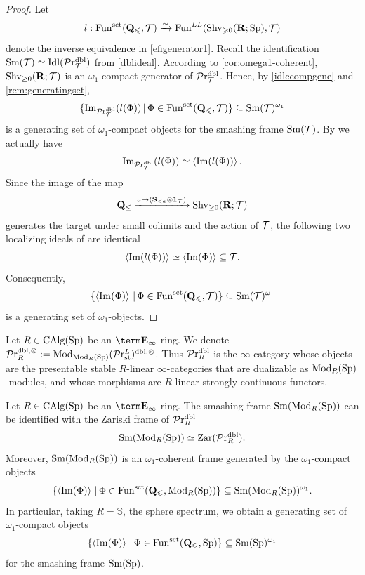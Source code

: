 \documentclass[10pt,a4paper,oneside]{article}
\begin{document}
\begin{proof}
Let $$l:\operatorname{Fun}^{\operatorname{sct}}(\mathbf{Q}_{\leqslant},\mathcal{T})\xrightarrow{\sim}\operatorname{Fun}^{L L}(\operatorname{Shv}_{\geqslant 0}(\mathbf{R} ; \mathrm{Sp}), \mathcal{T})$$ denote the inverse equivalence in \cref{efigenerator1}.
Recall the identification $\operatorname{Sm}(\mathcal{T})\simeq\operatorname{Idl}(\mathcal{P}\mathrm{r}_{\mathcal{T}}^{\operatorname{dbl}})$ from \cref{dblideal}. According to \cref{cor:omega1-coherent}, $\operatorname{Shv}_{\geq0}(\mathbf{R};\mathcal{T})$ is an $\omega_1$-compact generator of $\mathcal{P}\mathrm{r}_{\mathcal{T}}^{\operatorname{dbl}}$. Hence, by \cref{idlccompgene} and \cref{rem:generatingset},
$$\{\operatorname{Im}_{\mathcal{P}\mathrm{r}_{\mathcal{T}}^{\operatorname{dbl}}}(l(\Phi))\,|\, \Phi\in \operatorname{Fun}^{\operatorname{sct}}(\mathbf{Q}_{\leqslant},\mathcal{T})\}\subseteq \operatorname{Sm}(\mathcal{T})^{\omega_1}$$
is a generating set of $\omega_1$-compact objects for the smashing frame $\operatorname{Sm}(\mathcal{T})$. By \cite[Lemma 2.61]{ramzi2024dualizable} we actually have $$\operatorname{Im}_{\mathcal{P}\mathrm{r}_{\mathcal{T}}^{\operatorname{dbl}}}(l(\Phi))\simeq\left<\operatorname{Im}(l(\Phi))\right>.$$ Since the image of the map
$$\mathbf{Q}_{\le}\xrightarrow{a\mapsto(\mathbf{S}_{<a}\otimes \mathbf{1}_\mathcal{T})} \operatorname{Shv}_{\geq0}(\mathbf{R};\mathcal{T})$$
generates the target under small colimits and the action of $\mathcal{T}$, the following two localizing ideals of \mct are identical
$$\left<\operatorname{Im}(l(\Phi))\right>\simeq\left<\operatorname{Im}(\Phi)\right>\subseteq \mathcal{T}.$$
Consequently,
$$\{\left<\operatorname{Im}(\Phi)\right>\,|\, \Phi\in \operatorname{Fun}^{\operatorname{sct}}(\mathbf{Q}_{\leqslant},\mathcal{T})\}\subseteq \operatorname{Sm}(\mathcal{T})^{\omega_1}$$
is a generating set of $\omega_1$-objects.
\end{proof}

\begin{nota}
Let $R\in \operatorname{CAlg}(\operatorname{Sp})$ be an $\einf$-ring. We denote $\mathcal{P}\mathrm{r}_R^{\operatorname{dbl},\otimes}:=\operatorname{Mod}_{\operatorname{Mod}_R(\operatorname{Sp})}(\mathcal{P}\mathrm{r}_{\operatorname{st}}^L)^{\operatorname{dbl},\otimes}$. Thus $\mathcal{P}\mathrm{r}_R^{\operatorname{dbl}}$ is the $\infty$-category whose objects are the presentable stable $R$-linear $\infty$-categories that are dualizable as $\operatorname{Mod}_R(\operatorname{Sp})$-modules, and whose morphisms are $R$-linear strongly continuous functors.
\end{nota}

\begin{cor}
Let $R\in \operatorname{CAlg}(\operatorname{Sp})$ be an $\einf$-ring. The smashing frame $\operatorname{Sm}(\operatorname{Mod}_R(\operatorname{Sp}))$ %
can be identified with the Zariski frame of $\mathcal{P}\mathrm{r}_R^{\operatorname{dbl}}$  $$\operatorname{Sm}(\operatorname{Mod}_R(\operatorname{Sp}))\simeq\operatorname{Zar}(\mathcal{P}\mathrm{r}_R^{\operatorname{dbl}}).$$
Moreover, $\operatorname{Sm}(\operatorname{Mod}_R(\operatorname{Sp}))$ is an $\omega_1$-coherent frame generated by the $\omega_1$-compact objects $$\{\left<\operatorname{Im}(\Phi)\right>\,|\, \Phi\in \operatorname{Fun}^{\operatorname{sct}}(\mathbf{Q}_{\leqslant},\operatorname{Mod}_R(\operatorname{Sp}))\}\subseteq \operatorname{Sm}(\operatorname{Mod}_R(\operatorname{Sp}))^{\omega_1}.$$
In particular, taking $R=\mathbb{S}$, the sphere spectrum, we obtain a generating set of $\omega_1$-compact objects $$\{\left<\operatorname{Im}(\Phi)\right>\,|\, \Phi\in \operatorname{Fun}^{\operatorname{sct}}(\mathbf{Q}_{\leqslant},\operatorname{Sp})\}\subseteq \operatorname{Sm}(\operatorname{Sp})^{\omega_1}$$
for the smashing frame $\operatorname{Sm}(\operatorname{Sp})$.
\end{cor}
\end{document}
